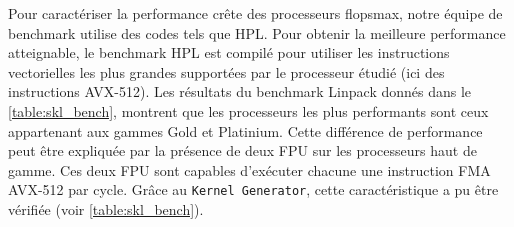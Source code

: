         
        \begin{table}[h!]
        \centering
        \caption{Principales différences entre les gammes de processeurs Intel de génération Skylake.}
        \label{table:skl}
        
        \end{table}
        
      
      Pour caractériser la performance crête des processeurs \gls{flopsmax}, notre équipe de benchmark utilise des codes tels que HPL. Pour obtenir la meilleure performance atteignable, le benchmark HPL est compilé pour utiliser les instructions vectorielles les plus grandes supportées par le processeur étudié (ici des instructions AVX-512). Les résultats du benchmark Linpack donnés dans le \autoref{table:skl_bench}, montrent que les processeurs les plus performants sont ceux appartenant aux gammes Gold et Platinium. Cette différence de performance peut être expliquée par la présence de deux \gls{FPU} sur les processeurs haut de gamme. Ces deux FPU sont capables d'exécuter chacune une instruction \gls{FMA} AVX-512 par cycle. Grâce au \verb|Kernel Generator|, cette caractéristique a pu être vérifiée (voir \autoref{table:skl_bench}). 

